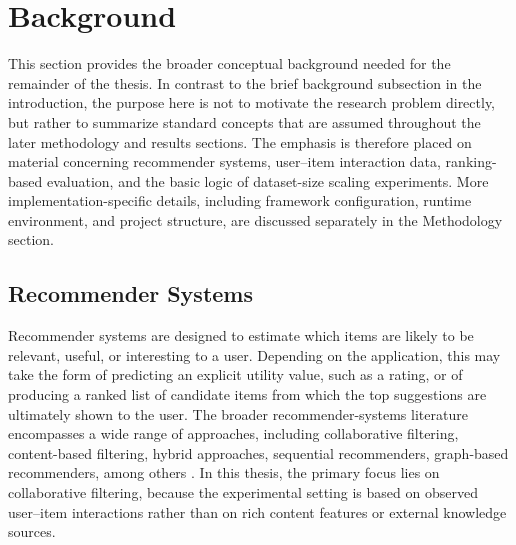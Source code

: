 \documentclass[12pt,a4paper]{article}
\begin{document}
\section{Background}
This section provides the broader conceptual background needed for the remainder of the thesis. In contrast to the brief background subsection in the introduction, the purpose here is not to motivate the research problem directly, but rather to summarize standard concepts that are assumed throughout the later methodology and results sections. The emphasis is therefore placed on material concerning recommender systems, user--item interaction data, ranking-based evaluation, and the basic logic of dataset-size scaling experiments. More implementation-specific details, including framework configuration, runtime environment, and project structure, are discussed separately in the Methodology section.

\subsection{Recommender Systems}
Recommender systems are designed to estimate which items are likely to be relevant, useful, or interesting to a user. Depending on the application, this may take the form of predicting an explicit utility value, such as a rating, or of producing a ranked list of candidate items from which the top suggestions are ultimately shown to the user. The broader recommender-systems literature encompasses a wide range of approaches, including collaborative filtering, content-based filtering, hybrid approaches, sequential recommenders, graph-based recommenders, among others \cite{raza2025}. In this thesis, the primary focus lies on collaborative filtering, because the experimental setting is based on observed user--item interactions rather than on rich content features or external knowledge sources.
\end{document}
